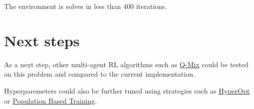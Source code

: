 \documentclass{article}
\begin{document}
    The environment is solves in less than 400 iterations.


    \section{Next steps}\label{sec:next-steps}

    As a next step, other multi-agent RL algorithms such as \href{http://proceedings.mlr.press/v80/rashid18a.html}{Q-Mix}
    could be tested on this problem and compared to the current implementation.

    Hyperparemeters could also be further tuned using strategies such as
    \href{https://github.com/hyperopt/hyperopt}{HyperOpt} or
    \href{https://deepmind.com/blog/article/population-based-training-neural-networks}{Population Based Training}.
\end{document}
